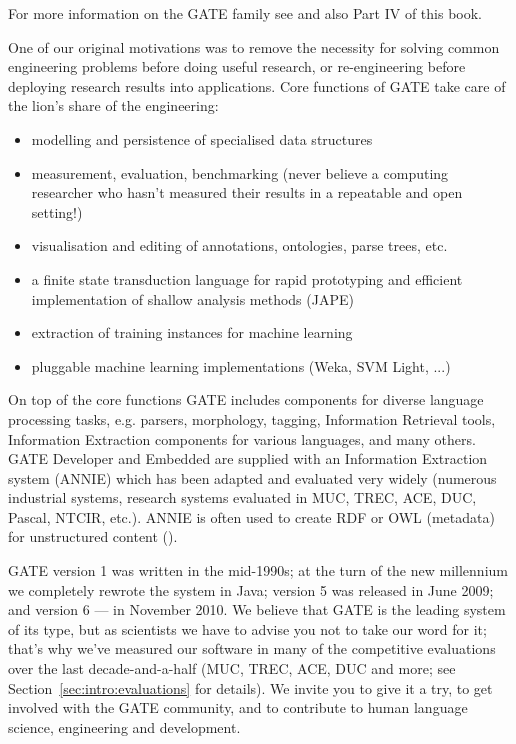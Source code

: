 For more information on the GATE family see  and also Part IV of this book.

One of our original motivations was to remove the necessity for
solving common engineering problems before doing useful research, or
re-engineering before deploying research results into
applications. Core functions of GATE take care of the lion's share of
the engineering:

\begin{itemize}
\item
modelling and persistence of specialised data structures
\item
measurement, evaluation, benchmarking (never believe a computing
    researcher who hasn't measured their results in a repeatable and open
    setting!)
\item
visualisation and editing of annotations, ontologies, parse trees, etc.
\item
a finite state transduction language for rapid prototyping and efficient
    implementation of shallow analysis methods (JAPE)
\item
extraction of training instances for machine learning
\item
pluggable machine learning implementations (Weka, SVM Light, ...)
\end{itemize}

On top of the core functions GATE includes components for diverse language
processing tasks, e.g. parsers, morphology, tagging, Information Retrieval tools,
Information Extraction components for various languages, and many others. GATE
Developer and Embedded are supplied with an Information Extraction system (ANNIE)
which has been adapted and evaluated very widely (numerous industrial systems,
research systems evaluated in MUC, TREC, ACE, DUC, Pascal, NTCIR, etc.). ANNIE is
often used to create RDF or OWL (metadata) for unstructured content
(\textit{}).
  
GATE version 1 was written in the mid-1990s; at the turn of the new millennium we
completely rewrote the system in Java; version 5 was released in June 2009; and 
version 6 --- in November 2010. We
believe that GATE is the leading system of its type, but as scientists we have to
advise you not to take our word for it; that's why we've measured our software in
many of the competitive evaluations over the last decade-and-a-half (MUC, TREC,
ACE, DUC and more; see Section~\ref{sec:intro:evaluations} for details). We
invite you to give it a try, to get involved with the GATE community, and to contribute to
human language science, engineering and development.


